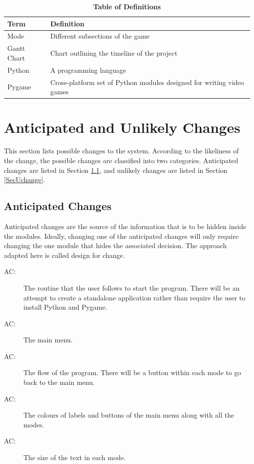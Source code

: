 \documentclass[12pt, titlepage]{article}
\newcounter{acnum}
\newcommand{\actheacnum}{AC\theacnum}
\begin{document}
\begin{table}[!htbp]
\caption{\textbf{Table of Definitions}} \label{Table}
\begin{tabularx}{\textwidth}{p{3cm}X}
\toprule
\textbf{Term} & \textbf{Definition}\\
\midrule
Mode & Different subsections of the game\\
Gantt Chart & Chart outlining the timeline of the project\\
Python & A programming language\\
Pygame & Cross-platform set of Python modules designed for writing video games\\
\bottomrule
\end{tabularx}
\end{table}	


\section{Anticipated and Unlikely Changes} \label{SecChange}

This section lists possible changes to the system. According to the likeliness
of the change, the possible changes are classified into two
categories. Anticipated changes are listed in Section \ref{SecAchange}, and
unlikely changes are listed in Section \ref{SecUchange}.

\subsection{Anticipated Changes} \label{SecAchange}

Anticipated changes are the source of the information that is to be hidden
inside the modules. Ideally, changing one of the anticipated changes will only
require changing the one module that hides the associated decision. The approach
adapted here is called design for
change.

\begin{description}
\item[ \actheacnum \label{acExecutable}:] The routine that the user follows to start the program. There will be an attempt to create a standalone application rather than require the user to install Python and Pygame.
\item[ \actheacnum \label{acI1}:] The main menu.
\item[ \actheacnum \label{acI2}:] The flow of the program. There will be a button within each mode to go back to the main menu.
\item[ \actheacnum \label{acI3}:] The colours of labels and buttons of the main menu along with all the modes.
\item[ \actheacnum \label{acI4}:] The size of the text in each mode.
\end{description}
\end{document}
